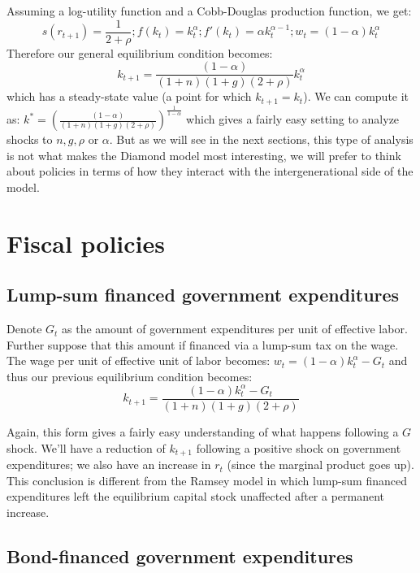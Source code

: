 \documentclass[12pt]{report}
\begin{document}
Assuming a log-utility function and a Cobb-Douglas production function, we get: $$ s(r_{t+1}) = \frac{1}{2+\rho} ; f(k_t) = k_t^\alpha ; f'(k_{t}) = \alpha k_t^{\alpha - 1} ; w_t = (1-\alpha)k_t^\alpha $$ Therefore our general equilibrium condition becomes: $$k_{t+1} = \frac{(1-\alpha)}{(1+n)(1+g)(2+\rho)}k_t^\alpha $$ which has a steady-state value (a point for which $k_{t+1} = k_t$). We can compute it as: $k^* = \left(\frac{(1-\alpha)}{(1+n)(1+g)(2+\rho)}\right)^{\frac{1}{1-\alpha}}$ which gives a fairly easy setting to analyze shocks to $n, g, \rho$ or $\alpha$. But as we will see in the next sections, this type of analysis is not what makes the Diamond model most interesting, we will prefer to think about policies in terms of how they interact with the intergenerational side of the model.

\section{Fiscal policies}

\subsection{Lump-sum financed government expenditures}

Denote $G_t$ as the amount of government expenditures per unit of effective labor. Further suppose that this amount if financed via a lump-sum tax on the wage. The wage per unit of effective unit of labor becomes: $w_t = (1-\alpha)k_t^\alpha - G_t $ and thus our previous equilibrium condition becomes: $$k_{t+1} = \frac{(1-\alpha)k_t^\alpha - G_t}{(1+n)(1+g)(2+\rho)} $$

Again, this form gives a fairly easy understanding of what happens following a $G$ shock. We'll have a reduction of $k_{t+1}$ following a positive shock on government expenditures; we also have an increase in $r_t$ (since the marginal product goes up). This conclusion is different from the Ramsey model in which lump-sum financed expenditures left the equilibrium capital stock unaffected after a permanent increase.

\subsection{Bond-financed government expenditures}
\end{document}
